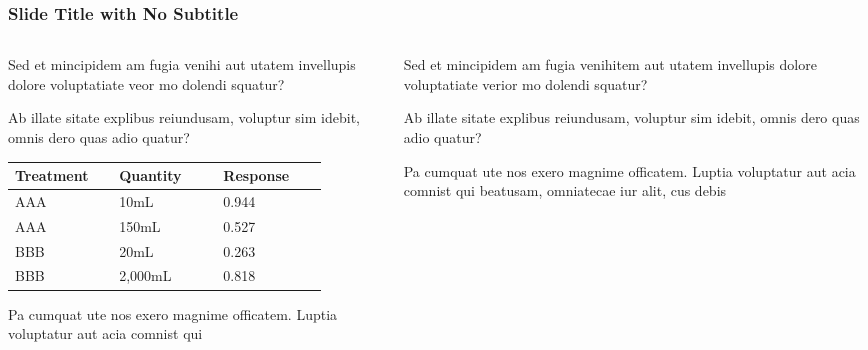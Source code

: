 \documentclass[
	aspectratio=169, %
	t, %
	onlytextwidth, %
	10pt, %
]{beamer}
\begin{document}
\begin{frame}
	\frametitle{Slide Title with No Subtitle}
	
	\begin{columns}[T] %
		\begin{column}{0.48\linewidth} %
			Sed et mincipidem am fugia venihi aut utatem invellupis dolore voluptatiate veor mo dolendi squatur?

			Ab illate sitate explibus reiundusam, voluptur sim idebit, omnis dero quas adio quatur?
			
			\begin{tabular}{L{0.28\linewidth} C{0.28\linewidth} R{0.28\linewidth}}
				\toprule
				Treatment & Quantity & Response\\
				\midrule
				AAA & 10mL & 0.944\\
				AAA & 150mL & 0.527\\
				BBB & 20mL & 0.263\\
				BBB & 2,000mL & 0.818\\
				\bottomrule
			\end{tabular}
			
			Pa cumquat ute nos exero magnime officatem. Luptia voluptatur aut acia comnist qui
		\end{column}
		\begin{column}{0.48\linewidth} %
			Sed et mincipidem am fugia venihitem aut utatem invellupis dolore voluptatiate verior mo dolendi squatur?

			Ab illate sitate explibus reiundusam, voluptur sim idebit, omnis dero quas adio quatur?

			Pa cumquat ute nos exero magnime officatem. Luptia voluptatur aut acia comnist qui beatusam, omniatecae iur alit, cus debis
		\end{column}
	\end{columns}
\end{frame}

\end{document}
